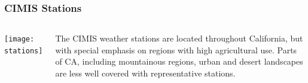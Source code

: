 \documentclass{beamer}
\begin{document}
\begin{frame}
  \frametitle{CIMIS Stations}
   \begin{columns}
     \texttt{[image: stations]}
     \begin{block}{}
       The \ac{CIMIS} weather stations are located throughout California, but
       with special emphasis on regions with high agricultural use.
       Parts of CA, including mountainous regions, urban and desert
       landscapes are less well covered with representative stations.
     \end{block}
   \end{columns}
  \label{fig:stations}
\end{frame}

\end{document}
